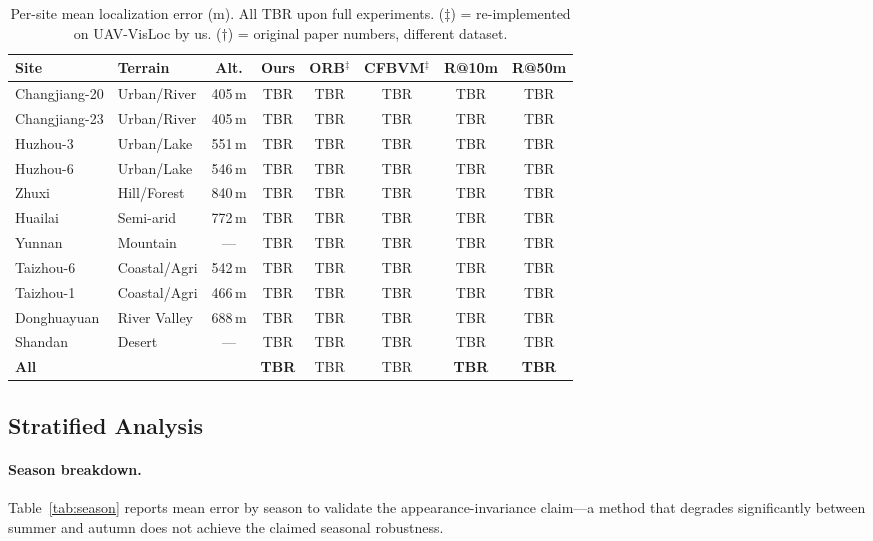 \documentclass[10pt]{article}
\theoremstyle{plain}
\theoremstyle{definition}
\begin{document}
\begin{table}[htbp]
\caption{Per-site mean localization error (m). All TBR upon full experiments.
  ($\ddagger$) = re-implemented on UAV-VisLoc by us.
  ($\dagger$) = original paper numbers, different dataset.}
\label{tab:persite}
\centering\small
\setlength{\tabcolsep}{3pt}
\begin{tabular}{llcccccc}
\toprule
\textbf{Site} & \textbf{Terrain} & \textbf{Alt.} &
\textbf{Ours} & \textbf{ORB$^\ddagger$} & \textbf{CFBVM$^\ddagger$} &
\textbf{R@10m} & \textbf{R@50m} \\
\midrule
Changjiang-20 & Urban/River   & 405\,m  & TBR & TBR & TBR & TBR & TBR \\
Changjiang-23 & Urban/River   & 405\,m  & TBR & TBR & TBR & TBR & TBR \\
Huzhou-3      & Urban/Lake    & 551\,m  & TBR & TBR & TBR & TBR & TBR \\
Huzhou-6      & Urban/Lake    & 546\,m  & TBR & TBR & TBR & TBR & TBR \\
Zhuxi         & Hill/Forest   & 840\,m  & TBR & TBR & TBR & TBR & TBR \\
Huailai       & Semi-arid     & 772\,m  & TBR & TBR & TBR & TBR & TBR \\
Yunnan        & Mountain      & ---     & TBR & TBR & TBR & TBR & TBR \\
Taizhou-6     & Coastal/Agri  & 542\,m  & TBR & TBR & TBR & TBR & TBR \\
Taizhou-1     & Coastal/Agri  & 466\,m  & TBR & TBR & TBR & TBR & TBR \\
Donghuayuan   & River Valley  & 688\,m  & TBR & TBR & TBR & TBR & TBR \\
Shandan       & Desert        & ---     & TBR & TBR & TBR & TBR & TBR \\
\midrule
\textbf{All}  &               &         & \textbf{TBR} & TBR & TBR & \textbf{TBR} & \textbf{TBR} \\
\bottomrule
\end{tabular}
\end{table}

\subsection{Stratified Analysis}
\label{sec:stratified}

\paragraph{Season breakdown.}
Table~\ref{tab:season} reports mean error by season to validate the
appearance-invariance claim---a method that degrades significantly between
summer and autumn does not achieve the claimed seasonal robustness.
\end{document}
